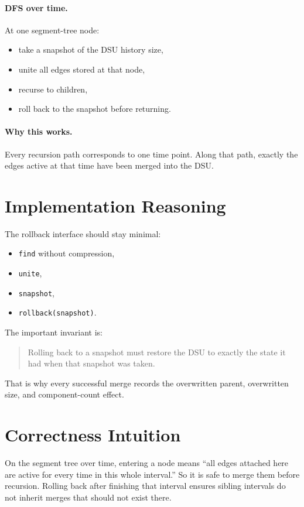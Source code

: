 \paragraph{DFS over time.}
At one segment-tree node:

\begin{itemize}
  \item take a snapshot of the DSU history size,
  \item unite all edges stored at that node,
  \item recurse to children,
  \item roll back to the snapshot before returning.
\end{itemize}

\paragraph{Why this works.}
Every recursion path corresponds to one time point. Along that path, exactly the edges active at that time have been
merged into the DSU.

\section*{Implementation Reasoning}

The rollback interface should stay minimal:

\begin{itemize}
  \item \texttt{find} without compression,
  \item \texttt{unite},
  \item \texttt{snapshot},
  \item \texttt{rollback(snapshot)}.
\end{itemize}

The important invariant is:

\begin{quote}
Rolling back to a snapshot must restore the DSU to exactly the state it had when that snapshot was taken.
\end{quote}

That is why every successful merge records the overwritten parent, overwritten size, and component-count effect.

\section*{Correctness Intuition}

On the segment tree over time, entering a node means ``all edges attached here are active for every time in this whole
interval.'' So it is safe to merge them before recursion. Rolling back after finishing that interval ensures sibling
intervals do not inherit merges that should not exist there.

